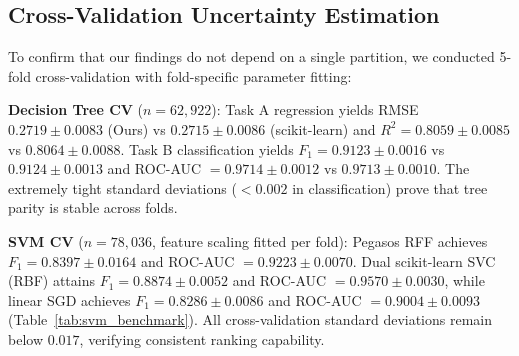 \documentclass[10pt,twocolumn,a4paper]{article}
\begin{document}
  \begin{table}[ht]
    \centering
    \caption{Task B SVM Benchmark: 5-Fold Cross-Validation and Test Set Performance.}
    \label{tab:svm_benchmark}
  \end{table}

  \subsection{Cross-Validation Uncertainty Estimation}
  To confirm that our findings do not depend on a single partition, we conducted 5-fold cross-validation with fold-specific parameter fitting:
  
  \textbf{Decision Tree CV} ($n = 62,922$): Task A regression yields RMSE $0.2719 \pm 0.0083$ (Ours) vs $0.2715 \pm 0.0086$ (scikit-learn) and $R^2 = 0.8059 \pm 0.0085$ vs $0.8064 \pm 0.0088$. Task B classification yields $F_1 = 0.9123 \pm 0.0016$ vs $0.9124 \pm 0.0013$ and ROC-AUC $= 0.9714 \pm 0.0012$ vs $0.9713 \pm 0.0010$. The extremely tight standard deviations ($< 0.002$ in classification) prove that tree parity is stable across folds.

  \textbf{SVM CV} ($n = 78,036$, feature scaling fitted per fold): Pegasos RFF achieves $F_1 = 0.8397 \pm 0.0164$ and ROC-AUC $= 0.9223 \pm 0.0070$. Dual scikit-learn SVC (RBF) attains $F_1 = 0.8874 \pm 0.0052$ and ROC-AUC $= 0.9570 \pm 0.0030$, while linear SGD achieves $F_1 = 0.8286 \pm 0.0086$ and ROC-AUC $= 0.9004 \pm 0.0093$ (Table~\ref{tab:svm_benchmark}). All cross-validation standard deviations remain below $0.017$, verifying consistent ranking capability.
\end{document}
